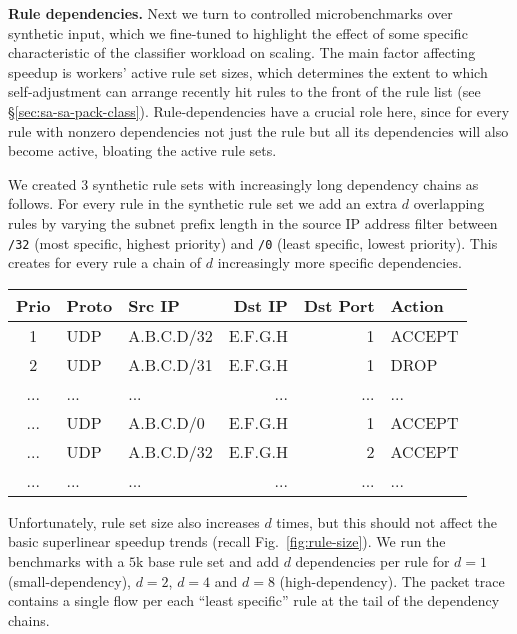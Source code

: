 \noindent%
\textbf{Rule dependencies.} %
Next we turn to controlled microbenchmarks over synthetic input, which we fine-tuned to highlight the effect of some specific characteristic of the classifier workload on scaling. The main factor affecting speedup is workers' active rule set sizes, which determines the extent to which self-adjustment can arrange recently hit rules to the front of the rule list (see \S\ref{sec:sa-sa-pack-class}). Rule-dependencies have a crucial role here, since for every rule with nonzero dependencies not just the rule but all its dependencies will also become active, bloating the active rule sets.

We created 3 synthetic rule sets with increasingly long dependency chains as follows. For every rule in the synthetic rule set we add an extra $d$ overlapping rules by varying the subnet prefix length in the source IP address filter between \texttt{/32} (most specific, highest priority) and \texttt{/0} (least specific, lowest priority). This creates for every rule a chain of $d$ increasingly more specific dependencies.

\noindent %
\begin{small}
  \addtolength{\tabcolsep}{-1pt}    
  \begin{tabular}{c|l|l|r|r|l}
    \textbf{Prio} & \textbf{Proto} & \textbf{Src IP} & \textbf{Dst IP} & \textbf{Dst Port} & \textbf{Action}\\
    \hline
    1 & UDP & A.B.C.D/32   & E.F.G.H  & 1  & ACCEPT\\
    2 & UDP & A.B.C.D/31   & E.F.G.H  & 1  & DROP\\
    ... & ... & ...   & ...  & ...  & ...\\
    ... & UDP & A.B.C.D/0   & E.F.G.H  & 1  & ACCEPT\\
    ... & UDP & A.B.C.D/32  & E.F.G.H  & 2  & ACCEPT\\
    ... & ... & ...   & ...  & ...  & ...\\
  \end{tabular}
  \addtolength{\tabcolsep}{1pt}    
\end{small}

\noindent %
Unfortunately, rule set size also increases $d$ times, but this should not affect the basic superlinear speedup trends (recall Fig.~\ref{fig:rule-size}). We run the benchmarks with a $5$k base rule set and add $d$ dependencies per rule for $d=1$ (small-dependency), $d=2$, $d=4$ and $d=8$ (high-dependency). The packet trace contains a single flow per each ``least specific'' rule at the tail of the dependency chains.  

